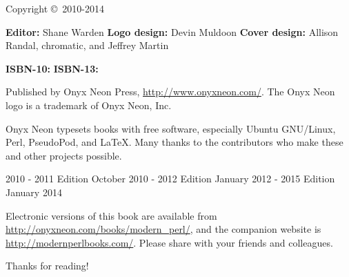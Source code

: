 \thispagestyle{empty}

\huge{\booktitle}
\newline
\large{\booksubtitle}
\newline
\newline
\normalsize

Copyright \copyright~2010-2014 \bookauthor

\vfill
\textbf{Editor:} Shane Warden\newline
\textbf{Logo design:} Devin Muldoon\newline
\textbf{Cover design:} Allison Randal, chromatic, and Jeffrey Martin

\textbf{ISBN-10:} \bookisbnten\newline
\textbf{ISBN-13:} \bookisbnthirteen

Published by Onyx Neon Press, \url{http://www.onyxneon.com/}.
The Onyx Neon logo is a trademark of Onyx Neon, Inc.

Onyx Neon typesets books with free software, especially Ubuntu GNU/Linux, Perl,
PseudoPod, and \LaTeX. Many thanks to the contributors who make these and other
projects possible.

2010 - 2011 Edition October 2010 - 2012 Edition January 2012 - 2015 Edition January 2014

Electronic versions of this book are available from
\url{http://onyxneon.com/books/modern_perl/}, and the companion website is
\url{http://modernperlbooks.com/}. Please share with your friends and
colleagues.

Thanks for reading!
